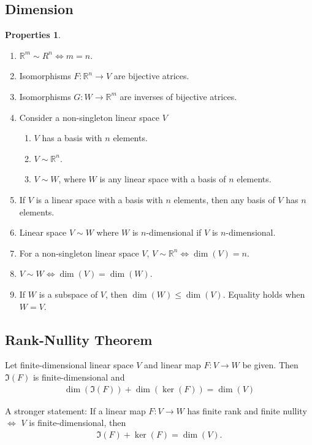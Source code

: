 \documentclass{book}
\theoremstyle{definition}
\newtheorem{prop}{Properties}[section]
\newcommand{\R}{\mathbb{R}}
\begin{document}
\subsection{Dimension}
\begin{prop}
	$\,$
	\begin{enumerate}
		\item $\R^m \sim R^n \iff m=n$.
		\item Isomorphisms $F : \R^n \rightarrow V$ are bijective atrices.
		\item Isomorphisms $G : W \rightarrow \R^m$ are inverses of bijective atrices.
		\item Consider a non-singleton linear space $V$
		\begin{enumerate}
			\item $V$ has a basis with $n$ elements.
			\item $V \sim \R^n$.
			\item $V \sim W$, where $W$ is any linear space with a basis of $n$ elements.
		\end{enumerate}
		\item If $V$ is a linear space with a basis with $n$ elements, then any basis of $V$ has $n$ elements.
		\item Linear space $V \sim W$ where $W$ is $n$-dimensional if $V$ is $n$-dimensional.
		\item For a non-singleton linear space $V$, $V\sim \R^n \iff \dim(V) = n$.
		\item $V \sim W \iff \dim(V) = \dim(W)$.
		\item If $W$ is a subspace of $V$, then $\dim(W)\leq \dim(V)$. Equality holds when $W = V$.
	\end{enumerate}
\end{prop}
\subsection{Rank-Nullity Theorem}
Let finite-dimensional linear space $V$ and linear map $F : V \rightarrow W$ be given. Then $\Im(F)$ is finite-dimensional and 
\begin{align*}
\dim(\Im(F)) + \dim(\ker(F)) = \dim(V)
\end{align*}

A stronger statement: If a linear map $F : V\rightarrow W$ has finite rank and finite nullity $\iff$ $V$ is finite-dimensional, then
\begin{align*}
\Im(F) + \ker(F) = \dim(V).
\end{align*}
\end{document}
